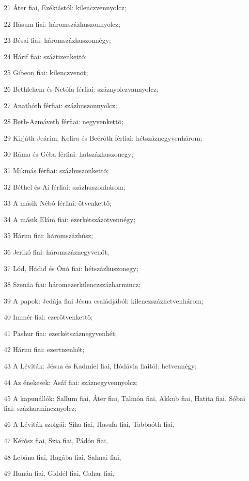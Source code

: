 \par 21 Áter fiai, Ezékiástól: kilenczvennyolcz;
\par 22 Hásum fiai: háromszázhuszonnyolcz;
\par 23 Bésai fiai: háromszázhuszonnégy;
\par 24 Hárif fiai: száztizenkettõ;
\par 25 Gibeon fiai: kilenczvenöt;
\par 26 Bethlehem és Netófa férfiai: száznyolczvannyolcz;
\par 27 Anathóth férfiai: százhuszonnyolcz;
\par 28 Beth-Azmáveth férfiai: negyvenkettõ;
\par 29 Kirjáth-Jeárim, Kefira és Beéróth férfiai: hétszáznegyvenhárom;
\par 30 Ráma és Géba férfiai: hatszázhuszonegy;
\par 31 Mikmás férfiai: százhuszonkettõ;
\par 32 Béthel és Ai férfiai: százhuszonhárom;
\par 33 A másik Nébó férfiai: ötvenkettõ;
\par 34 A másik Elám fiai: ezerkétszázötvennégy;
\par 35 Hárim fiai: háromszázhúsz;
\par 36 Jerikó fiai: háromszáznegyvenöt;
\par 37 Lód, Hádid és Ónó fiai: hétszázhuszonegy;
\par 38 Szenáa fiai: háromezerkilenczszázharmincz;
\par 39 A papok: Jedája fiai Jésua családjából: kilenczszázhetvenhárom;
\par 40 Immér fiai: ezerötvenkettõ;
\par 41 Pashur fiai: ezerkétszáznegyvenhét;
\par 42 Hárim fiai: ezertizenhét;
\par 43 A Léviták: Jésua és Kadmiel fiai, Hódávia fiaitól: hetvennégy;
\par 44 Az énekesek: Asáf fiai: száznegyvennyolcz;
\par 45 A kapunállók: Sallum fiai, Áter fiai, Talmón fiai, Akkub fiai, Hatita fiai, Sóbai fiai: százharmincznyolcz;
\par 46 A Léviták szolgái: Siha fiai, Hasufa fiai, Tabbaóth fiai,
\par 47 Kérósz fiai, Szia fiai, Pádón fiai,
\par 48 Lebána fiai, Hagába fiai, Salmai fiai,
\par 49 Hanán fiai, Giddél fiai, Gahar fiai,
